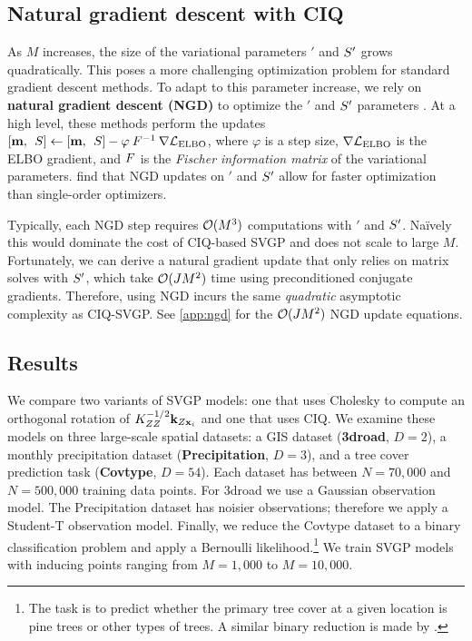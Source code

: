 \subsection{Natural gradient descent with CIQ}
As $M$ increases, the size of the variational parameters $\bm'$ and $S'$ grows quadratically.
This poses a more challenging optimization problem for standard gradient descent methods.
To adapt to this parameter increase, we rely on {\bf natural gradient descent (NGD)} to optimize the $\bm'$ and $S'$ parameters \citep[e.g.][]{hensman2012fast,salimbeni2018natural}.
At a high level, these methods perform the updates $[\mathbf{m}, \:\: S] \gets [\mathbf{m}, \:\: S] - \varphi \: F^{-1} \: \nabla \mathcal L_\text{ELBO}$,
where $\varphi$ is a step size, $\nabla \mathcal L_\text{ELBO}$ is the ELBO gradient, and $F$ is the \emph{Fischer information matrix} of the variational parameters.
\citet{salimbeni2018natural} find that NGD updates on $\bm'$ and $S'$ allow for faster optimization than single-order optimizers.

Typically, each NGD step requires $\bigo{M^3}$ computations with $\bm'$ and $S'$.
Na\"ively this would dominate the cost of CIQ-based SVGP and does not scale to large $M$.
Fortunately, we can derive a natural gradient update that only relies on matrix solves with $S'$, which take $\bigo{J M^2}$ time using preconditioned conjugate gradients.
Therefore, using NGD incurs the same \emph{quadratic} asymptotic complexity as CIQ-SVGP.
See \cref{app:ngd} for the $\bigo{JM^2}$ NGD update equations.


\subsection{Results}

We compare two variants of SVGP models: one that uses Cholesky to compute an orthogonal rotation of $K_{Z Z}^{-1/2} \mathbf{k}_{Z \mathbf{x}_i}$
and one that uses CIQ.
We examine these models on three large-scale spatial datasets: a GIS dataset ({\bf 3droad}, $D=2$), a monthly precipitation dataset ({\bf Precipitation}, $D=3$), and a tree cover prediction task ({\bf Covtype}, $D=54$).
Each dataset has between $N=70,\!000$ and $N=500,\!000$ training data points.
For 3droad we use a Gaussian observation model.
The Precipitation dataset has noisier observations; therefore we apply a Student-T observation model.
Finally, we reduce the Covtype dataset to a binary classification problem and apply a Bernoulli likelihood.\footnote{
  The task is to predict whether the primary tree cover at a given location is pine trees or other types of trees.
  A similar binary reduction is made by \cite{izmailov2018scalable}.
}
We train SVGP models with inducing points ranging from $M=1,\!000$ to $M=10,\!000$.

